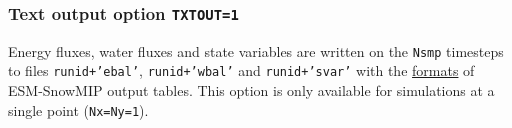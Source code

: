 \documentclass{article}
\begin{document}
\subsubsection{Text output option {\tt TXTOUT=1}}
Energy fluxes, water fluxes and state variables are written on the {\tt Nsmp} timesteps to files {\tt runid+'ebal'}, {\tt runid+'wbal'} and {\tt runid+'svar'} with the 
\href{https://www.geos.ed.ac.uk/~ressery/ESM-SnowMIP/ESMSnowMIP_Reference_sites.pdf}{formats} of ESM-SnowMIP output tables. This option is only available for simulations at a single point ({\tt Nx=Ny=1}).
\end{document}
